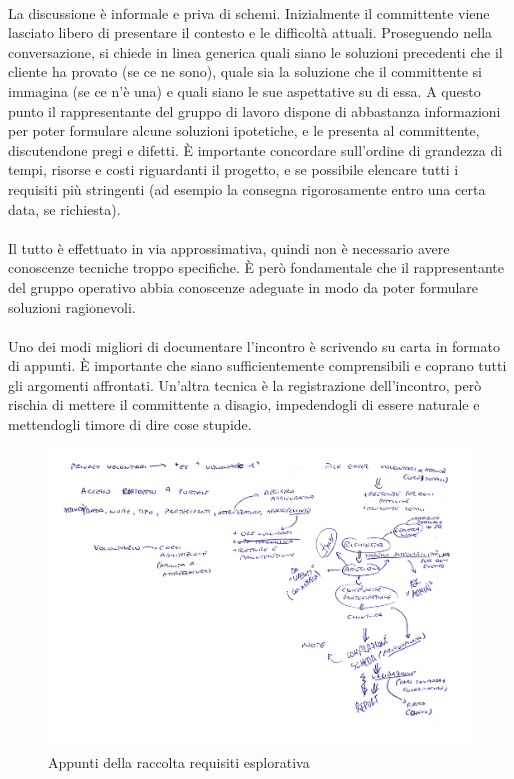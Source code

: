 \documentclass[12pt,a4paper,twoside,english,italian]{book}
\begin{document}
\newpage

\paragraph{} La discussione è informale e priva di schemi. Inizialmente il committente viene lasciato libero di presentare il contesto e le difficoltà attuali. Proseguendo nella conversazione, si chiede in linea generica quali siano le soluzioni precedenti che il cliente ha provato (se ce ne sono), quale sia la soluzione che il committente si immagina (se ce n'è una) e quali siano le sue aspettative su di essa. A questo punto il rappresentante del gruppo di lavoro dispone di abbastanza informazioni per poter formulare alcune soluzioni ipotetiche, e le presenta al committente, discutendone pregi e difetti. È importante concordare sull'ordine di grandezza di tempi, risorse e costi riguardanti il progetto, e se possibile elencare tutti i requisiti più stringenti (ad esempio la consegna rigorosamente entro una certa data, se richiesta). 

\paragraph{} Il tutto è effettuato in via approssimativa, quindi non è necessario avere conoscenze tecniche troppo specifiche. È però fondamentale che il rappresentante del gruppo operativo abbia conoscenze adeguate in modo da poter formulare soluzioni ragionevoli.

\paragraph{} Uno dei modi migliori di documentare l'incontro è scrivendo su carta in formato di appunti. È importante che siano sufficientemente comprensibili e coprano tutti gli argomenti affrontati. Un'altra tecnica è la registrazione dell'incontro, però rischia di mettere il committente a disagio, impedendogli di essere naturale e mettendogli timore di dire cose stupide. 


\begin{figure}[H]
    \centering
    \includegraphics[width=.8\textwidth]{img/analisi_esplorativa.pdf}
    \caption{Appunti della raccolta requisiti esplorativa}
\end{figure}
\end{document}
